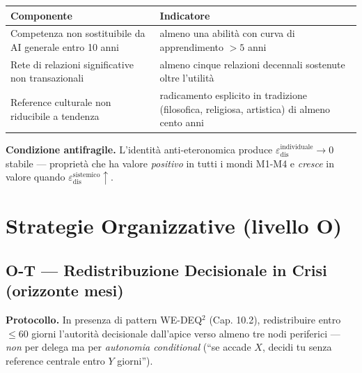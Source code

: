 {\def\LTcaptype{none} %
{\small\begin{longtable}[]{@{}
  >{\raggedright\arraybackslash}p{}
  >{\raggedright\arraybackslash}p{}@{}}
\toprule\noalign{}
\begin{minipage}[b]{\linewidth}\raggedright
Componente
\end{minipage} & \begin{minipage}[b]{\linewidth}\raggedright
Indicatore
\end{minipage} \\
\midrule\noalign{}
\endhead
\bottomrule\noalign{}
\endlastfoot
Competenza non sostituibile da AI generale entro 10 anni & almeno una
abilità con curva di apprendimento \(> 5\) anni \\
Rete di relazioni significative non transazionali & almeno cinque
relazioni decennali sostenute oltre l'utilità \\
Reference culturale non riducibile a tendenza & radicamento esplicito
in tradizione (filosofica, religiosa, artistica) di almeno cento anni \\
\end{longtable}}
}

\Proved{} \textbf{Condizione antifragile.} L'identità anti-eteronomica
produce \(\varepsilon_{\text{dis}}^{\text{individuale}} \to 0\) stabile
--- proprietà che ha valore \emph{positivo} in tutti i mondi M1-M4 e
\emph{cresce} in valore quando
\(\varepsilon_{\text{dis}}^{\text{sistemico}} \uparrow\).



\section{Strategie Organizzative (livello
O)}\label{strategie-organizzative-livello-o}

\subsection{O-T --- Redistribuzione Decisionale in Crisi (orizzonte
mesi)}\label{o-t-redistribuzione-decisionale-in-crisi-orizzonte-mesi}

\Hypoth{} \textbf{Protocollo.} In presenza di pattern WE-DEQ$^2$ (Cap.
10.2), redistribuire entro \(\leq 60\) giorni l'autorità decisionale
dall'apice verso almeno tre nodi periferici --- \emph{non} per delega ma
per \emph{autonomia conditional} (``se accade \(X\), decidi tu senza
reference centrale entro \(Y\) giorni'').

